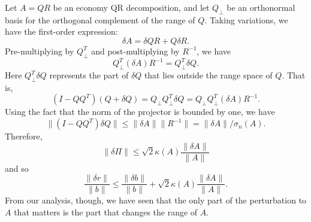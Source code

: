 \documentclass[12pt, leqno]{article} %
\begin{document}
Let $A = QR$ be an economy QR decomposition, and let $Q_\perp$ be an
orthonormal basis for the orthogonal complement of the range of $Q$.
Taking variations, we have the first-order expression:
\[
  \delta A = \delta Q R + Q \delta R.
\]
Pre-multiplying by $Q_\perp^T$ and post-multiplying by $R^{-1}$, we have
\[
  Q_\perp^T (\delta A) R^{-1} = Q_{\perp}^T \delta Q.
\]
Here $Q_{\perp}^T \delta Q$ represents the part of $\delta Q$ that
lies outside the range space of $Q$.  That is,
\[
  (I-QQ^T) (Q+\delta Q)
  = Q_\perp Q_\perp^T \delta Q
  = Q_\perp Q_\perp^T (\delta A) R^{-1}.
\]
Using the fact that the norm of the projector is bounded by one,
we have
\[
  \|(I-QQ^T) \delta Q\|
    \leq \|\delta A\| \|R^{-1}\|
    = \|\delta A\|/\sigma_n(A).
\]
Therefore,
\[
  \|\delta \Pi\| \leq \sqrt{2} \kappa(A) \frac{\|\delta A\|}{\|A\|}
\]
and so
\[
  \frac{\|\delta r\|}{\|b\|} \leq
  \frac{\|\delta b\|}{\|b\|} +
  \sqrt{2} \kappa(A) \frac{\|\delta A\|}{\|A\|}.
\]
From our analysis, though, we have seen that the only part of the
perturbation to $A$ that matters is the part that changes the range
of $A$.
\end{document}
